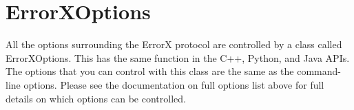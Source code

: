 \documentclass[letterpaper,10pt,english]{sphinxmanual}
\begin{document}
\chapter{ErrorXOptions}
\label{\detokenize{index:errorxoptions}}
All the options surrounding the ErrorX protocol are controlled by a class called ErrorXOptions. This has the same function in the C++, Python, and Java APIs. The options that you can control with this class are the same as the command-line options. Please see the documentation on full options list above for full details on which options can be controlled.



\renewcommand{\indexname}{Index}
\printindex
\end{document}

